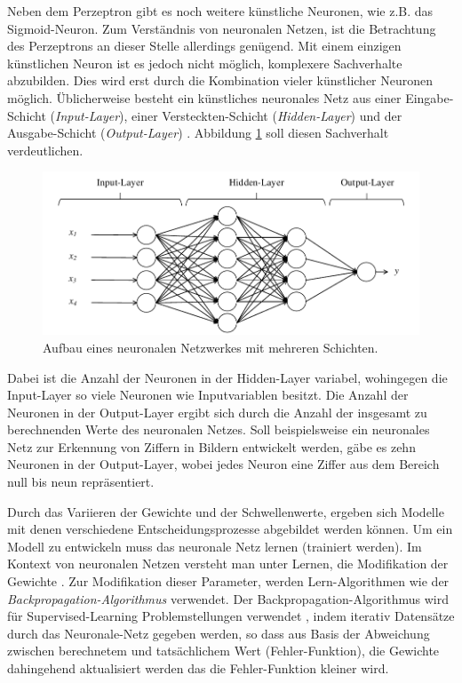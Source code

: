 Neben dem Perzeptron gibt es noch weitere künstliche Neuronen, wie z.B. das Sigmoid-Neuron. Zum Verständnis von neuronalen Netzen, ist die Betrachtung des Perzeptrons an dieser Stelle allerdings genügend. Mit einem einzigen künstlichen Neuron ist es jedoch nicht möglich, komplexere Sachverhalte abzubilden. Dies wird erst durch die Kombination vieler künstlicher Neuronen möglich. Üblicherweise besteht ein künstliches neuronales Netz aus einer Eingabe-Schicht (\emph{Input-Layer}), einer Versteckten-Schicht (\emph{Hidden-Layer}) und der Ausgabe-Schicht (\emph{Output-Layer}) \cite [vgl. S. 291]{WE16}. Abbildung \ref{fig:multilayerNN} soll diesen Sachverhalt verdeutlichen. 

\begin{figure}[ht]
\centering
\includegraphics{images/multilayerNN.pdf}
\caption{Aufbau eines neuronalen Netzwerkes mit mehreren Schichten.}
\label{fig:multilayerNN}
\end{figure}

Dabei ist die Anzahl der Neuronen in der Hidden-Layer variabel, wohingegen die Input-Layer so viele Neuronen wie Inputvariablen besitzt. Die Anzahl der Neuronen in der Output-Layer ergibt sich durch die Anzahl der insgesamt zu berechnenden Werte des neuronalen Netzes. Soll beispielsweise ein neuronales Netz zur Erkennung von Ziffern in Bildern entwickelt werden, gäbe es zehn Neuronen in der Output-Layer, wobei jedes Neuron eine Ziffer aus dem Bereich null bis neun repräsentiert.    

Durch das Variieren der Gewichte und der Schwellenwerte, ergeben sich Modelle mit denen verschiedene Entscheidungsprozesse abgebildet werden können. Um ein Modell zu entwickeln muss das neuronale Netz lernen (trainiert werden). Im Kontext von neuronalen Netzen versteht man unter Lernen, die Modifikation der Gewichte \cite {WE16}. Zur Modifikation dieser Parameter, werden Lern-Algorithmen wie der \textit{Backpropagation-Algorithmus} verwendet. Der Backpropagation-Algorithmus wird für Supervised-Learning Problemstellungen verwendet \cite [vgl. S. 89] {EA16}, indem iterativ Datensätze durch das Neuronale-Netz gegeben werden, so dass aus Basis der Abweichung zwischen berechnetem und tatsächlichem Wert (Fehler-Funktion), die Gewichte dahingehend aktualisiert werden das die Fehler-Funktion kleiner wird.           


